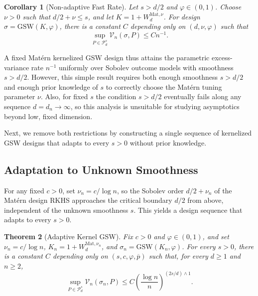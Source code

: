 \documentclass[letterpaper,12pt]{article}
\newtheorem{thm}{Theorem}[section]
\newtheorem{cor}[thm]{Corollary}
\theoremstyle{definition}
\numberwithin{equation}{section}
\newcommand{\mc}{\mathcal}
\begin{document}
\begin{cor}[Non-adaptive Fast Rate]\label{corollary:matern-supercritical}
Let $s>d/2$ and $\varphi\in(0,1)$.
Choose $\nu>0$ such that $d/2+\nu\leq s$, and let $K=1+W_d^{\mathrm{Mat},\nu}$.
For design $\sigma=\mathrm{GSW}(K,\varphi)$, there is a constant $C$ depending only on $(d,\nu,\varphi)$ such that
\begin{equation}\label{equation:matern-supercritical}
\sup_{P\in\mc P_d^s}\mc V_n(\sigma,P) \leq C n^{-1}.
\end{equation}
\end{cor}

A fixed Mat\'ern kernelized GSW design thus attains the parametric excess-variance rate $n^{-1}$ uniformly over Sobolev outcome models with smoothness $s>d/2$.
However, this simple result requires both enough smoothness $s>d/2$ and enough prior knowledge of $s$ to correctly choose the Mat\'ern tuning parameter $\nu$.
Also, for fixed $s$ the condition $s>d/2$ eventually fails along any sequence $d=d_n\to\infty$, so this analysis is unsuitable for studying asymptotics beyond low, fixed dimension.

Next, we remove both restrictions by constructing a single sequence of kernelized GSW designs that adapts to every $s>0$ without prior knowledge.

\subsection{Adaptation to Unknown Smoothness}\label{subsection:sobolev-adaptation}

For any fixed $c>0$, set $\nu_n=c/\log n$, so the Sobolev order $d/2+\nu_n$ of the Mat\'ern design RKHS approaches the critical boundary $d/2$ from above, independent of the unknown smoothness $s$.
This yields a design sequence that adapts to every $s>0$.

\begin{thm}[Adaptive Kernel GSW]\label{theorem:sobolev-gsw}
Fix $c>0$ and $\varphi\in(0,1)$, and set $\nu_n=c/\log n$, $K_n=1+W_d^{\mathrm{Mat},\nu_n}$, and $\sigma_n=\mathrm{GSW}(K_n,\varphi)$.
For every $s>0$, there is a constant $C$ depending only on $(s,c,\varphi,\overline p)$ such that, for every $d\geq1$ and $n\geq2$,
\begin{equation}\label{equation:sobolev-gsw}
\sup_{P\in\mc P_d^s}\mc V_n(\sigma_n,P) \leq C\left(\frac{\log n}{n}\right)^{(2s/d)\wedge 1}.
\end{equation}
\end{thm}
\end{document}
